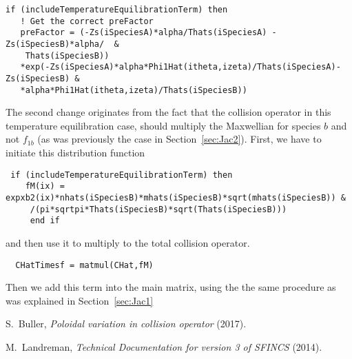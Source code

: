 \documentclass[12pt]{article}
\begin{document}
\begin{lstlisting}
if (includeTemperatureEquilibrationTerm) then
   ! Get the correct preFactor
   preFactor = (-Zs(iSpeciesA)*alpha/Thats(iSpeciesA) -Zs(iSpeciesB)*alpha/  & 
    Thats(iSpeciesB)) 
   *exp(-Zs(iSpeciesA)*alpha*Phi1Hat(itheta,izeta)/Thats(iSpeciesA)-Zs(iSpeciesB) & 
   *alpha*Phi1Hat(itheta,izeta)/Thats(iSpeciesB))
\end{lstlisting}
\noindent
The second change originates from the fact that the collision operator in this temperature equilibration case, should multiply the Maxwellian for species $b$ and not $f_{1b}$ (as was previously the case in Section~\ref{sec:Jac2}).  First, we have to initiate this distribution function
 \begin{lstlisting}
 if (includeTemperatureEquilibrationTerm) then
    fM(ix) = expxb2(ix)*nhats(iSpeciesB)*mhats(iSpeciesB)*sqrt(mhats(iSpeciesB)) &
     /(pi*sqrtpi*Thats(iSpeciesB)*sqrt(Thats(iSpeciesB)))
     end if   
\end{lstlisting}
\noindent
and then use it to multiply to the total collision operator.
 \begin{lstlisting}
  CHatTimesf = matmul(CHat,fM)
 \end{lstlisting}
\noindent
Then we add this term into the main matrix, using the the same procedure as was explained in Section~\ref{sec:Jac1}

\newpage

\begin{thebibliography}{99}

 S.~Buller, {\em Poloidal variation in collision operator} (2017).

 M.~Landreman, {\em Technical Documentation for version 3 of SFINCS} (2014).

  



\end{thebibliography}
\end{document}

